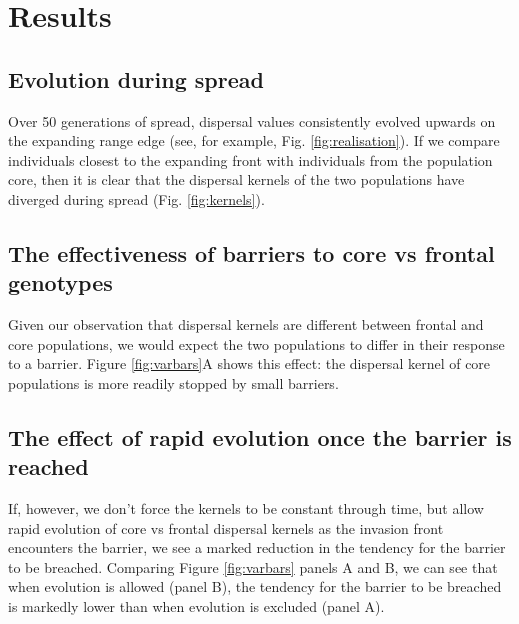 \documentclass{article}
\begin{document}
  
    

\section{Results}\label{results}

\subsection{Evolution during spread}\label{evolution-during-spread}

Over 50 generations of spread, dispersal values consistently evolved upwards on the expanding
range edge (see, for example, Fig. \ref{fig:realisation}). If we compare individuals closest to the expanding front
with individuals from the population core, then it is clear that the dispersal kernels of the two populations have diverged
during spread (Fig. \ref{fig:kernels}).

\subsection{The effectiveness of barriers to core vs frontal
genotypes}\label{the-effectiveness-of-barriers-to-core-vs-frontal-genotypes-1}

Given our observation that dispersal kernels are different between
frontal and core populations, we would expect the two populations to differ in
their response to a barrier. Figure \ref{fig:varbars}A shows this effect: the dispersal kernel of core
populations is more readily stopped
by small barriers.

\subsection{The effect of rapid evolution once the barrier is reached}

If, however, we don't force the kernels to be constant through time, but allow rapid evolution of core vs frontal dispersal kernels as the invasion front encounters the barrier, we see a marked reduction in the tendency for the barrier to be breached. Comparing Figure \ref{fig:varbars} panels A and B, we can see that when evolution is allowed (panel B), the tendency for the barrier to be breached is markedly lower than when evolution is excluded (panel A).
\end{document}
